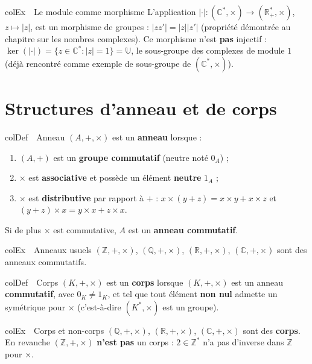 \documentclass[11pt,a4paper]{article}
\newenvironment{definition}[1][Définition]
  {\begin{fiche}{colDef}{\ding{110}~~#1}}{\end{fiche}}
\newenvironment{exemple}[1][Exemple]
  {\begin{fiche}{colEx}{\ding{217}~~#1}}{\end{fiche}}
\begin{document}
\begin{exemple}[Le module comme morphisme]
L'application $|\cdot|:(\mathbb{C}^*,\times)\to(\mathbb{R}_+^*,\times)$, $z\mapsto|z|$, est un morphisme de groupes : $|zz'|=|z||z'|$ (propriété démontrée au chapitre sur les nombres complexes). Ce morphisme n'est \textbf{pas} injectif : $\ker(|\cdot|)=\{z\in\mathbb{C}^* : |z|=1\}=\mathbb{U}$, le sous-groupe des complexes de module $1$ (déjà rencontré comme exemple de sous-groupe de $(\mathbb{C}^*,\times)$).
\end{exemple}

\section{Structures d'anneau et de corps}

\begin{definition}[Anneau]
$(A,+,\times)$ est un \textbf{anneau} lorsque :
\begin{enumerate}[leftmargin=7mm, itemsep=0.5mm]
  \item $(A,+)$ est un \textbf{groupe commutatif} (neutre noté $0_A$) ;
  \item $\times$ est \textbf{associative} et possède un élément \textbf{neutre} $1_A$ ;
  \item $\times$ est \textbf{distributive} par rapport à $+$ : $x\times(y+z)=x\times y+x\times z$ et $(y+z)\times x=y\times x+z\times x$.
\end{enumerate}
Si de plus $\times$ est commutative, $A$ est un \textbf{anneau commutatif}.
\end{definition}

\begin{exemple}[Anneaux usuels]
$(\mathbb{Z},+,\times)$, $(\mathbb{Q},+,\times)$, $(\mathbb{R},+,\times)$, $(\mathbb{C},+,\times)$ sont des anneaux commutatifs.
\end{exemple}

\begin{definition}[Corps]
$(K,+,\times)$ est un \textbf{corps} lorsque $(K,+,\times)$ est un anneau \textbf{commutatif}, avec $0_K\ne1_K$, et tel que tout élément \textbf{non nul} admette un symétrique pour $\times$ (c'est-à-dire $(K^*,\times)$ est un groupe).
\end{definition}

\begin{exemple}[Corps et non-corps]
$(\mathbb{Q},+,\times)$, $(\mathbb{R},+,\times)$, $(\mathbb{C},+,\times)$ sont des \textbf{corps}. En revanche $(\mathbb{Z},+,\times)$ \textbf{n'est pas} un corps : $2\in\mathbb{Z}^*$ n'a pas d'inverse dans $\mathbb{Z}$ pour $\times$.
\end{exemple}
\end{document}
